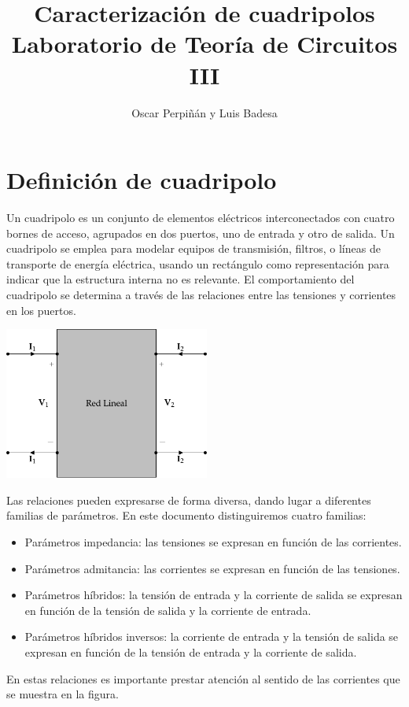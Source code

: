 \documentclass[10pt]{article}
\title{Caracterización de cuadripolos\\Laboratorio de Teoría de Circuitos III}
\author{Oscar Perpiñán y Luis Badesa}
\begin{document}
\maketitle


\section{Definición de cuadripolo}

Un cuadripolo es un conjunto de elementos eléctricos interconectados con cuatro bornes de acceso, agrupados en dos puertos, uno de entrada y otro de salida. Un cuadripolo se emplea para modelar equipos de transmisión, filtros, o líneas de transporte de energía eléctrica, usando un rectángulo como representación para indicar que la estructura interna no es relevante. El comportamiento del cuadripolo se determina a través de las relaciones entre las tensiones y corrientes en los puertos. 
\begin{center}
\includegraphics[height=5cm]{../figs/cuadripolo.pdf}
\end{center}

Las relaciones pueden expresarse de forma diversa, dando lugar a diferentes familias de parámetros. En este documento distinguiremos cuatro familias:
\begin{itemize}
\item Parámetros impedancia: las tensiones se expresan en función de las corrientes.
\item Parámetros admitancia: las corrientes se expresan en función de las tensiones.
\item Parámetros híbridos: la tensión de entrada y la corriente de salida se expresan en función de la tensión de salida y la corriente de entrada.
\item Parámetros híbridos inversos: la corriente de entrada y la tensión de salida se expresan en función de la tensión de entrada y la corriente de salida.
\end{itemize}

En estas relaciones es importante prestar atención al sentido de las corrientes que se muestra en la figura.
\end{document}
